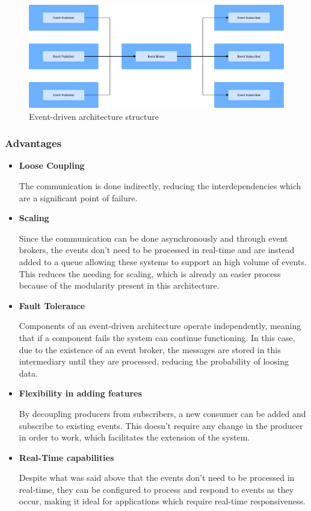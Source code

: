 \begin{figure}[htbp]
	\centering
	\includegraphics[width=\textwidth, height=0.5\textheight, keepaspectratio]{Chapters/Figures/Architectures/Event-driven.pdf}
	\caption{Event-driven architecture structure}
	\label{fig:architectures:event-driven}
\end{figure}

\subsubsection{Advantages}
\begin{itemize}
	\item \textbf{Loose Coupling}

	      The communication is done indirectly, reducing the interdependencies which
	      are a significant point of failure.

	\item \textbf{Scaling}

	      Since the communication can be done asynchronously and through event brokers,
	      the events don't need to be processed in real-time and are instead added to
	      a queue allowing these systems to support an high volume of events. This
	      reduces the needing for scaling, which is already an easier process because
	      of the modularity present in this architecture.

	\item \textbf{Fault Tolerance}

	      Components of an event-driven architecture operate independently, meaning
	      that if a component fails the system can continue functioning. In this
	      case, due to the existence of an event broker, the messages are stored in
	      this intermediary until they are processed, reducing the probability of
	      loosing data.

	\item \textbf{Flexibility in adding features}

	      By decoupling producers from subscribers, a new consumer can be added
	      and subscribe to existing events. This doesn't require any change in the
	      producer in order to work, which facilitates the extension of the
	      system.

	\item \textbf{Real-Time capabilities}

	      Despite what was said above that the events don't need to be processed
	      in real-time, they can be configured to process and respond to events
	      as they occur, making it ideal for applications which require real-time
	      responsiveness.
\end{itemize}

